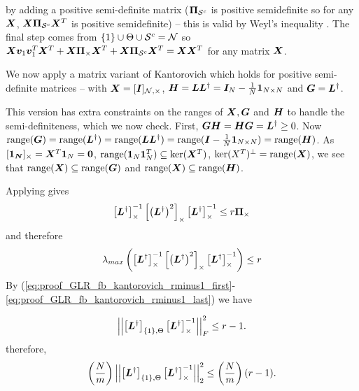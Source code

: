  by adding a positive semi-definite matrix  ($\projgen{\set{S}^{c}}$ is positive semidefinite so for any $\bm{X}$, $\matr{X}\projgen{\set{S}^{c}}\matr{X}^{T}$ is positive semidefinite) -- this is valid by Weyl's inequality \cite[Corollary III.2.2, page 63]{bhatia2013matrix}. The final step comes from $\{1\} \cup \Theta \cup \mathcal{S}^{c} = \mathcal{N}$ so $\matr{X}\vect{v}_{1}\vect{v}_{1}^{T}\matr{X}^{T} + \matr{X}\proj{\Theta}\matr{X}^{T} + \matr{X}\projgen{\set{S}^{c}}\matr{X}^{T} = \matr{X}\matr{X}^{T}$ for any matrix $\bm{X}$.

 We now apply a matrix variant of Kantorovich which holds for positive semi-definite matrices -- \cite[Theorem 3]{liu1997kantorovich} with $\matr{X} = \matrsub[N,\Theta]{I}$,  $\bm{H} = \bm{L}\bm{L}^{\dagger} =\bm{I}_{N} - \frac{1}{N}\bm{1}_{N \times N}$ and $\bm{G} = \bm{L}^{\dagger}$. 
 
 This version has extra constraints on the ranges of $\bm{X}, \bm{G}$ and $\bm{H}$ to handle the semi-definiteness, which we now check. First, $\bm{G}\bm{H} = \bm{H}\bm{G}  = \bm{L}^{\dagger} \geq 0$.   Now $\text{range}(\bm{G}) = \text{range}(\bm{L}^{\dagger}) = \text{range}(\bm{L}\bm{L}^{\dagger}) = \text{range}(\bm{I}-\frac{1}{N}\bm{1}_{N \times N}) = \text{range}(\bm{H})$. As $\vectsub[\Theta]{1_{N}} = \matr{X}^{T}\vect{1}_{N} = \vect{0}$,  $\text{range}(\bm{1}_{N}\bm{1}_{N}^{T}) \subseteq \text{ker}(\bm{X}^{T})$,  $\text{ker}(
 X^{T})^{\perp} = \text{range}(\bm{X})$, we see that $\text{range}(\bm{X})\subseteq \text{range}(\bm{G})$ and $\text{range}(\bm{X})\subseteq \text{range}(\bm{H})$. 

 Applying \cite[Theorem 3]{liu1997kantorovich} gives
 \begin{equation}
     \msub[\Theta]{\matr{L}^{\dagger}}^{-1}\msub[\Theta]{\left(\matr{L}^{\dagger}\right)^{2}}\msub[\Theta]{\matr{L}^{\dagger}}^{-1} \leq r \proj{\Theta}
 \end{equation}
 and therefore
 \begin{equation}
     \lambda_{max}\left( \msub[\Theta]{\matr{L}^{\dagger}}^{-1}\msub[\Theta]{\left(\matr{L}^{\dagger}\right)^{2}}\msub[\Theta]{\matr{L}^{\dagger}}^{-1}\right) \leq r 
 \end{equation}
By (\ref{eq:proof_GLR_fb_kantorovich_rminus1_first}-\ref{eq:proof_GLR_fb_kantorovich_rminus1_last}) we have

\begin{equation}
    \sqfrob{\msubgen[\{1\},\Theta]{\matr{L}^{\dagger}}\msub[\Theta]{\matr{L}^{\dagger}}^{-1}} \leq r-1.
\end{equation}
therefore, 
\begin{equation}
\left(\frac{N}{m}\right) \sqnormvec{\msubgen[\{1\}, \Theta]{\matr{L}^{\dagger}}\msub[\Theta]{\matr{L}^{\dagger}}^{-1}}
\leq \left(\frac{N}{m} \right)(r-1).
\end{equation}

